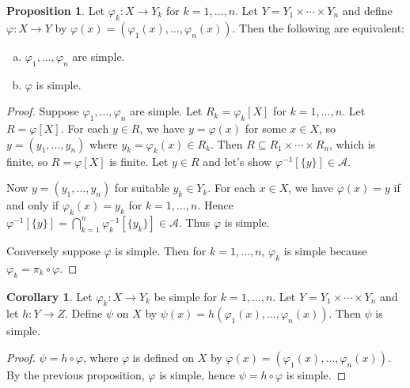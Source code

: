 \documentclass{article}
\theoremstyle{definition}
\newtheorem{corollary}[theorem]{Corollary}
\newtheorem{proposition}[theorem]{Proposition}
\begin{document}
\begin{proposition}
    Let $\varphi_k: X \longrightarrow Y_k$ for $k = 1, \ldots, n$. Let $Y = Y_1 \times \cdots \times Y_n$ and define $\varphi: X \longrightarrow Y$ by $\varphi(x) = (\varphi_1(x), \ldots, \varphi_n(x))$. Then the following are equivalent:
    \begin{enumerate}[(a)] %
        \item $\varphi_1, \ldots, \varphi_n$ are simple.
        \item $\varphi$ is simple.
    \end{enumerate}
\end{proposition}
\begin{proof}
    Suppose $\varphi_1, \ldots, \varphi_n$ are simple. Let $R_k = \varphi_k[X]$ for $k = 1, \ldots, n$. Let $R = \varphi[X]$. For each $y \in R$, we have $y = \varphi(x)$ for some $x \in X$, so $y = (y_1, \ldots, y_n)$ where $y_k = \varphi_k(x) \in R_k$.
    Then $R \subseteq R_1 \times \cdots \times R_n$, which is finite, so $R = \varphi[X]$ is finite. Let $y \in R$ and let's show $\varphi^{-1}[\{y\}] \in \mathscr{A}$.
    
    Now $y = (y_1, \ldots, y_n)$ for suitable $y_k \in Y_k$. For each $x \in X$, we have $\varphi(x) = y$ if and only if $\varphi_k(x) = y_k$ for $k = 1, \ldots, n$. Hence $\varphi^{-1}[\{y\}] = \bigcap_{k=1}^n \varphi_k^{-1}[\{y_k\}] \in \mathscr{A}$. Thus $\varphi$ is simple.
    
    Conversely suppose $\varphi$ is simple. Then for $k = 1, \ldots, n$, $\varphi_k$ is simple because $\varphi_k = \pi_k \circ \varphi$.
\end{proof}

\begin{corollary}
    Let $\varphi_k : X \longrightarrow Y_k$ be simple for $k = 1, \ldots, n$.
    Let $Y = Y_1 \times \cdots \times Y_n$ and let $h: Y \longrightarrow Z$. Define $\psi$ on $X$ by $\psi(x) = h(\varphi_1(x), \ldots, \varphi_n(x))$. Then $\psi$ is simple.
\end{corollary}
\begin{proof}
    $\psi = h \circ \varphi$, where $\varphi$ is defined on $X$ by $\varphi(x) = (\varphi_1(x), \ldots, \varphi_n(x))$. By the previous proposition, $\varphi$ is simple, hence $\psi = h \circ \varphi$ is simple.
\end{proof}
\end{document}
